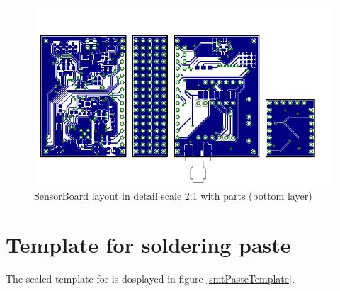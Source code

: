 \begin{figure}
	\centering
	\includegraphics[angle=90, scale=2]{img/brdCBottom.pdf}
	\caption{SensorBoard layout in detail scale 2:1 with parts (bottom layer)}
	\label{brdBottomC}
\end{figure}

\section{Template for soldering paste}
\label{app:smtPasteTemplate}
The scaled template for  is dosplayed in figure \ref{smtPasteTemplate}.


